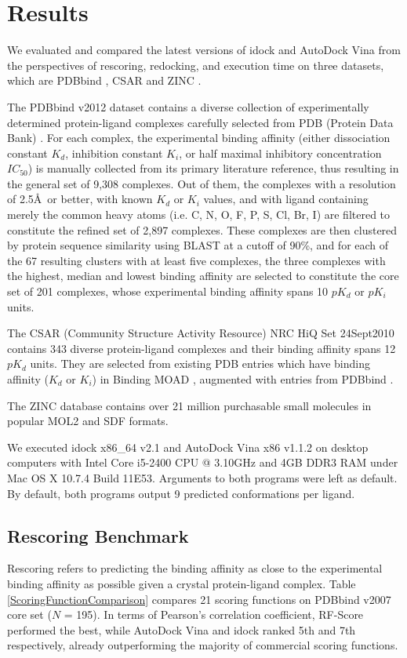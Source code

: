 \documentclass[10pt]{article}
\begin{document}
\section*{Results}
We evaluated and compared the latest versions of idock and AutoDock Vina from the perspectives of rescoring, redocking, and execution time on three datasets, which are PDBbind \cite{529,530}, CSAR \cite{857,960} and ZINC \cite{532,1178}.

The PDBbind v2012 dataset contains a diverse collection of experimentally determined protein-ligand complexes carefully selected from PDB (Protein Data Bank) \cite{540,537}. For each complex, the experimental binding affinity (either dissociation constant $K_d$, inhibition constant $K_i$, or half maximal inhibitory concentration $IC_{50}$) is manually collected from its primary literature reference, thus resulting in the general set of 9,308 complexes. Out of them, the complexes with a resolution of 2.5\AA\ or better, with known $K_d$ or $K_i$ values, and with ligand containing merely the common heavy atoms (i.e. C, N, O, F, P, S, Cl, Br, I) are filtered to constitute the refined set of 2,897 complexes. These complexes are then clustered by protein sequence similarity using BLAST at a cutoff of 90\%, and for each of the 67 resulting clusters with at least five complexes, the three complexes with the highest, median and lowest binding affinity are selected to constitute the core set of 201 complexes, whose experimental binding affinity spans 10 $pK_d$ or $pK_i$ units.

The CSAR (Community Structure Activity Resource) NRC HiQ Set 24Sept2010 contains 343 diverse protein-ligand complexes and their binding affinity spans 12 $pK_d$ units. They are selected from existing PDB \cite{540,537} entries which have binding affinity ($K_d$ or $K_i$) in Binding MOAD \cite{517,518}, augmented with entries from PDBbind \cite{529,530}.

The ZINC database contains over 21 million purchasable small molecules in popular MOL2 and SDF formats.

We executed idock x86\_64 v2.1 and AutoDock Vina x86 v1.1.2 on desktop computers with Intel Core i5-2400 CPU @ 3.10GHz and 4GB DDR3 RAM under Mac OS X 10.7.4 Build 11E53. Arguments to both programs were left as default. By default, both programs output 9 predicted conformations per ligand.

\subsection*{Rescoring Benchmark}
Rescoring refers to predicting the binding affinity as close to the experimental binding affinity as possible given a crystal protein-ligand complex. Table \ref{ScoringFunctionComparison} compares 21 scoring functions on PDBbind v2007 core set ($N$ = 195). In terms of Pearson's correlation coefficient, RF-Score performed the best, while AutoDock Vina and idock ranked 5th and 7th respectively, already outperforming the majority of commercial scoring functions.
\end{document}
